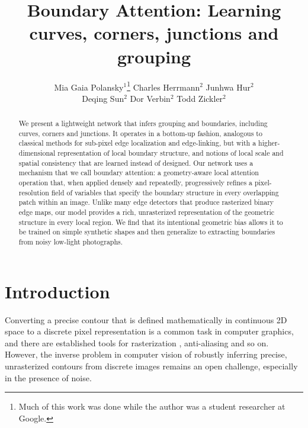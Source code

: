 \documentclass[main.tex]{subfiles}
\begin{document}
\title{Boundary Attention: Learning curves, corners, junctions and grouping}

\author{Mia Gaia Polansky$^{1}$\thanks{Much of this work was done while the author was a student researcher at Google.} \quad Charles Herrmann$^2$
\quad  Junhwa Hur$^2$ \\
\quad  Deqing Sun$^2$
\quad  Dor Verbin$^2$ \quad  Todd Zickler$^2$}

\maketitle

\begin{abstract}
We present a lightweight network that infers grouping and boundaries, including curves, corners and junctions. It operates in a bottom-up fashion, analogous to classical methods for sub-pixel edge localization and edge-linking, but with a higher-dimensional representation of local boundary structure, and notions of local scale and spatial consistency that are learned instead of designed. Our network uses a mechanism that we call boundary attention: a geometry-aware local attention operation that, when applied densely and repeatedly, progressively refines a pixel-resolution field of variables that specify the boundary structure in every overlapping patch within an image. Unlike many edge detectors that produce rasterized binary edge maps, our model provides a rich, unrasterized representation of the geometric structure in every local region.  We find that its intentional geometric bias allows it to be trained on simple synthetic shapes and then generalize to extracting boundaries from noisy low-light photographs.
\end{abstract}

\section{Introduction}
\label{sec:intro}

Converting a precise contour that is defined mathematically in continuous 2D space to a discrete pixel representation is a common task in computer graphics, and there are established tools for rasterization \cite{foley1982fundamentals,pineda1988parallel}, anti-aliasing \cite{heckbert1989fundamentals,catmull1974subdivision} and so on. However, the inverse problem in computer vision of robustly inferring precise, unrasterized contours from discrete images remains an open challenge, especially in the presence of noise. 
\end{document}

